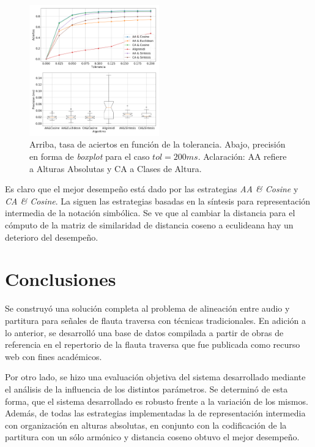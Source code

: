 \documentclass
  [ams,pdfout]%
	{aeslac}
\begin{document}
\begin{figure}[h!]
\begin{center}
\includegraphics[width=0.5\textwidth]{imagenes/comparacion} 	
\caption{Arriba, tasa de aciertos en función de la tolerancia. Abajo, precisión en forma de \textit{boxplot} para el caso $tol=200ms$. Aclaración: AA refiere a Alturas Absolutas y CA a Clases de Altura.}
\label{fig:comparacion}
\end{center}
\end{figure}

Es claro que el mejor desempeño está dado por las estrategias \textit{AA \& Cosine} y \textit{CA \& Cosine}. La siguen las estrategias basadas en la síntesis para representación intermedia de la notación simbólica. Se ve que al cambiar la distancia para el cómputo de la matriz de similaridad de distancia coseno a eculideana hay un deterioro del desempeño. 


\section{Conclusiones}

Se construyó una solución completa al problema de alineación entre audio y partitura para señales de flauta traversa con técnicas tradicionales. En adición a lo anterior, se desarrolló una base de datos compilada a partir de obras de referencia en el repertorio de la flauta traversa que fue publicada como recurso web con fines académicos.

Por otro lado, se hizo una evaluación objetiva del sistema desarrollado mediante el análisis de la influencia de los distintos parámetros. Se determinó de esta forma, que el sistema desarrollado es robusto frente a la variación de los mismos. Además, de todas las estrategias implementadas la de representación intermedia con organización en alturas absolutas, en conjunto con la codificación de la partitura con un sólo armónico y distancia coseno obtuvo el mejor desempeño. 
\end{document}
